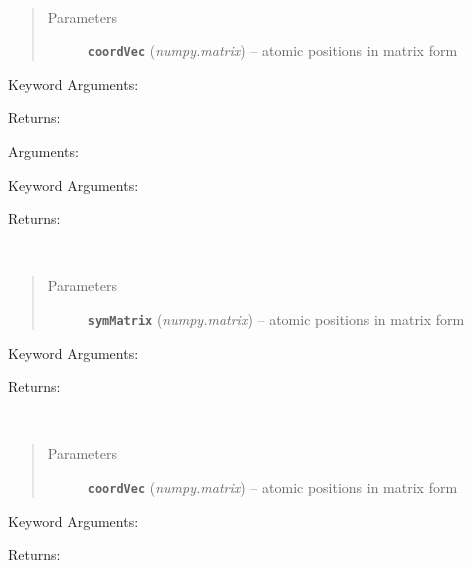 \documentclass[letterpaper,10pt,english]{sphinxmanual}
\begin{document}

\begin{fulllineitems}
\label{retr:retr.__shiftAfterRotation}~\begin{quote}\begin{description}
\item[{Parameters}] \leavevmode
\textbf{\texttt{coordVec}} (\emph{numpy.matrix}) -- atomic positions in matrix form

\end{description}\end{quote}

Keyword Arguments:

Returns:

\end{fulllineitems}


\begin{fulllineitems}
\label{retr:retr.__shiftBeforeRotation}
Arguments:

Keyword Arguments:

Returns:

\end{fulllineitems}


\begin{fulllineitems}
\label{retr:retr.__shiftCell}~\begin{quote}\begin{description}
\item[{Parameters}] \leavevmode
\textbf{\texttt{symMatrix}} (\emph{numpy.matrix}) -- atomic positions in matrix form

\end{description}\end{quote}

Keyword Arguments:

Returns:

\end{fulllineitems}


\begin{fulllineitems}
\label{retr:retr.__shiftX}~\begin{quote}\begin{description}
\item[{Parameters}] \leavevmode
\textbf{\texttt{coordVec}} (\emph{numpy.matrix}) -- atomic positions in matrix form

\end{description}\end{quote}

Keyword Arguments:

Returns:

\end{fulllineitems}
\end{document}
